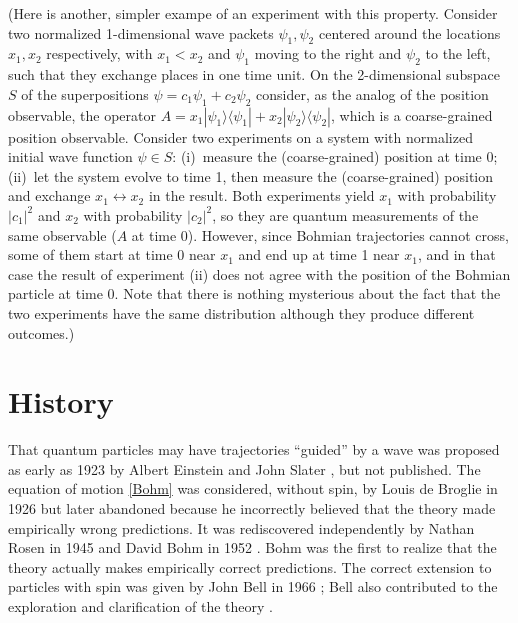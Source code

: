 \documentclass[12pt]{article}
\begin{document}
(Here is another, simpler exampe of an experiment with this property. Consider two normalized 1-dimensional wave packets $\psi_1,\psi_2$ centered around the locations $x_1,x_2$ respectively, with $x_1<x_2$ and $\psi_1$ moving to the right and $\psi_2$ to the left, such that they exchange places in one time unit. On the 2-dimensional subspace $S$ of the superpositions $\psi = c_1 \psi_1 + c_2 \psi_2$ consider, as the analog of the position observable, the operator $A= x_1 |\psi_1\rangle \langle \psi_1| + x_2 |\psi_2\rangle \langle \psi_2|$, which is a coarse-grained position observable. Consider two experiments on a system with normalized initial wave function $\psi\in S$: (i)~measure the (coarse-grained) position at time 0; (ii)~let the system evolve to time 1, then measure the (coarse-grained) position and exchange $x_1 \leftrightarrow x_2$ in the result. Both experiments yield $x_1$ with probability $|c_1|^2$ and $x_2$ with probability $|c_2|^2$, so they are quantum measurements of the same observable ($A$ at time 0). However, since Bohmian trajectories cannot cross, some of them start at time 0 near $x_1$ and end up at time 1 near $x_1$, and in that case the result of experiment (ii) does not agree with the position of the Bohmian particle at time $0$. Note that there is nothing mysterious about the fact that the two experiments have the same distribution although they produce different outcomes.)





\section{History}

That quantum particles may have trajectories ``guided'' by a wave was proposed as early as 1923 by Albert Einstein \cite[p.~463]{WignerEinst} and John Slater \cite[p.~9]{Sla75}, \cite[p.~544]{Mehra} but not published. The equation of motion \eqref{Bohm} was considered, without spin, by Louis de Broglie in 1926 \cite{deB} but later abandoned because he incorrectly believed that the theory made empirically wrong predictions. It was rediscovered independently by Nathan Rosen in 1945 \cite{Ros45} and David Bohm in 1952 \cite{Bohm52}. Bohm was the first to realize that the theory actually makes empirically correct predictions. The correct extension to particles with spin was given by John Bell in 1966 \cite{Bell66}; Bell also contributed to the exploration and clarification of the theory \cite{Bell87b}.
\end{document}
